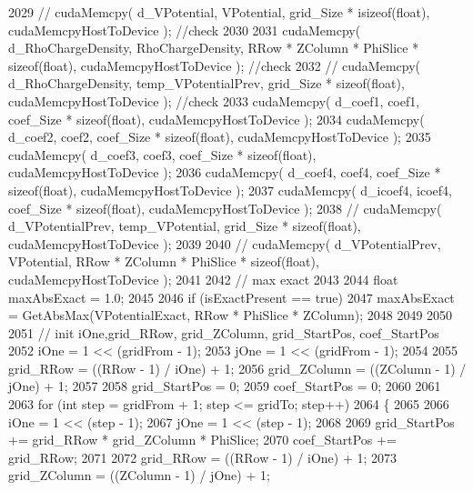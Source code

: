\begin{DoxyCode}
2029 \textcolor{comment}{//  cudaMemcpy( d\_VPotential, VPotential, grid\_Size * isizeof(float), cudaMemcpyHostToDevice ); //check}
2030 
2031     cudaMemcpy( d\_RhoChargeDensity, RhoChargeDensity, RRow * ZColumn * PhiSlice * \textcolor{keyword}{sizeof}(\textcolor{keywordtype}{float}), 
      cudaMemcpyHostToDevice ); \textcolor{comment}{//check}
2032 \textcolor{comment}{//  cudaMemcpy( d\_RhoChargeDensity, temp\_VPotentialPrev, grid\_Size * sizeof(float), cudaMemcpyHostToDevice
       ); //check}
2033     cudaMemcpy( d\_coef1, coef1, coef\_Size * \textcolor{keyword}{sizeof}(\textcolor{keywordtype}{float}), cudaMemcpyHostToDevice );
2034     cudaMemcpy( d\_coef2, coef2, coef\_Size * \textcolor{keyword}{sizeof}(\textcolor{keywordtype}{float}), cudaMemcpyHostToDevice );
2035     cudaMemcpy( d\_coef3, coef3, coef\_Size * \textcolor{keyword}{sizeof}(\textcolor{keywordtype}{float}), cudaMemcpyHostToDevice );
2036     cudaMemcpy( d\_coef4, coef4, coef\_Size * \textcolor{keyword}{sizeof}(\textcolor{keywordtype}{float}), cudaMemcpyHostToDevice );
2037     cudaMemcpy( d\_icoef4, icoef4, coef\_Size * \textcolor{keyword}{sizeof}(\textcolor{keywordtype}{float}), cudaMemcpyHostToDevice );
2038 \textcolor{comment}{//  cudaMemcpy( d\_VPotentialPrev, temp\_VPotential, grid\_Size * sizeof(float), cudaMemcpyHostToDevice );}
2039 
2040 \textcolor{comment}{//  cudaMemcpy( d\_VPotentialPrev, VPotential, RRow * ZColumn * PhiSlice * sizeof(float),
       cudaMemcpyHostToDevice );}
2041     
2042     \textcolor{comment}{// max exact}
2043     
2044     \textcolor{keywordtype}{float} maxAbsExact = 1.0;
2045 
2046     \textcolor{keywordflow}{if} (isExactPresent == \textcolor{keyword}{true})
2047         maxAbsExact = GetAbsMax(VPotentialExact, RRow * PhiSlice * ZColumn);
2048     
2049     
2050 
2051     \textcolor{comment}{// init iOne,grid\_RRow, grid\_ZColumn, grid\_StartPos, coef\_StartPos}
2052     iOne = 1 << (gridFrom - 1); 
2053     jOne = 1 << (gridFrom - 1);
2054 
2055     grid\_RRow       = ((RRow - 1) / iOne) + 1;
2056     grid\_ZColumn    = ((ZColumn - 1) / jOne) + 1;
2057 
2058     grid\_StartPos = 0;
2059     coef\_StartPos = 0;
2060 
2061 
2063     \textcolor{keywordflow}{for} (\textcolor{keywordtype}{int} step = gridFrom + 1; step <= gridTo; step++)
2064     \{
2065 
2066         iOne = 1 << (step - 1); 
2067         jOne = 1 << (step - 1);
2068 
2069         grid\_StartPos += grid\_RRow * grid\_ZColumn * PhiSlice;
2070         coef\_StartPos += grid\_RRow;
2071 
2072         grid\_RRow       = ((RRow - 1) / iOne) + 1;
2073         grid\_ZColumn    = ((ZColumn - 1) / jOne) + 1;

\end{DoxyCode}
